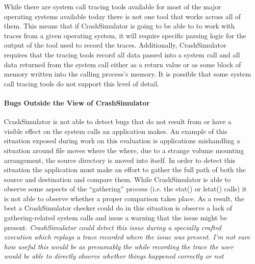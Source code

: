         While there are system call tracing tools available for most of the major operating systems available today
        there is not one tool that works across all of them.  This means that if CrashSimulator is going to be able to
        to work with traces from a given operating system, it will require specific parsing logic for the output of the
        tool used to record the traces.  Additionally, CrashSimulator requires that the tracing tools record all data
        passed into a system call and all data returned from the system call either as a return value or as some block
        of memory written into the calling process's memory.  It is possible that some system call tracing tools do not
        support this level of detail.

        \paragraph{Bugs Outside the View of CrashSimulator}

        CrashSimulator is not able to detect bugs that do not result from or have a visible effect on the system calls
        an application makes.  An example of this situation exposed during work on this evaluation is applications
        mishandling a situation around file moves where the where, due to a strange volume mounting arrangement, the
        source directory is moved into itself.  In order to detect this situation the application must make an effort to
        gather the full path of both the source and destination and compare them.  While CrashSimulator is able to
        observe some aspects of the ``gathering'' process (i.e. the stat() or lstat() calls) it is not able to observe
        whether a proper comparison takes place.  As a result, the best a CrashSimulator checker could do in this
        situation is observe a lack of gathering-related system calls and issue a warning that the issue might be
        present.  \emph{CrashSimulator could detect this issue during a specially crafted execution which replays a
          trace recorded where the issue was present.  I'm not sure how useful this would be as presumably the while
          recording the trace the user would be able to directly observe whether things happened correctly or not}

